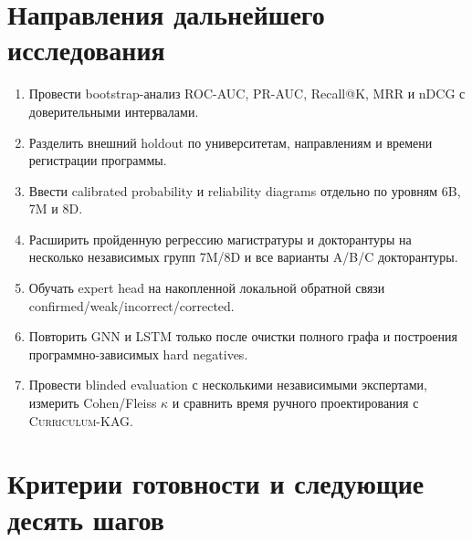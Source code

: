 \documentclass[twoside,11pt]{article}
\newcommand{\systemname}{\textsc{Curriculum-KAG}}
\begin{document}
\section{Направления дальнейшего исследования}

\begin{enumerate}
  \item Провести bootstrap-анализ ROC-AUC, PR-AUC, Recall@K, MRR и nDCG с доверительными интервалами.
  \item Разделить внешний holdout по университетам, направлениям и времени регистрации программы.
  \item Ввести calibrated probability и reliability diagrams отдельно по уровням 6B, 7M и 8D.
  \item Расширить пройденную регрессию магистратуры и докторантуры на несколько независимых групп 7M/8D и все варианты A/B/C докторантуры.
  \item Обучать expert head на накопленной локальной обратной связи confirmed/weak/incorrect/corrected.
  \item Повторить GNN и LSTM только после очистки полного графа и построения программно-зависимых hard negatives.
  \item Провести blinded evaluation с несколькими независимыми экспертами, измерить Cohen/Fleiss $\kappa$ и сравнить время ручного проектирования с \systemname{}.
\end{enumerate}

\section{Критерии готовности и следующие десять шагов}
\end{document}
